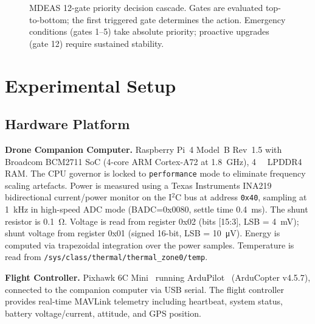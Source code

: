 \documentclass[conference]{IEEEtran}
\begin{document}
\begin{figure}[!b]
    \caption{MDEAS 12-gate priority decision cascade. Gates are evaluated top-to-bottom; the first triggered gate determines the action. Emergency conditions (gates 1--5) take absolute priority; proactive upgrades (gate 12) require sustained stability.}
    \label{fig:mdeas-cascade}
\end{figure}

\FloatBarrier
\section{Experimental Setup}
\label{sec:setup}

\subsection{Hardware Platform}

\textbf{Drone Companion Computer.}
Raspberry Pi~4 Model~B Rev~1.5 with Broadcom BCM2711 SoC (4-core ARM Cortex-A72 at \SI{1.8}{\giga\hertz}), \SI{4}{\giga\byte} LPDDR4 RAM.
The CPU governor is locked to \texttt{performance} mode to eliminate frequency scaling artefacts.
Power is measured using a Texas Instruments INA219~\cite{ina219} bidirectional current/power monitor on the I$^2$C bus at address \texttt{0x40}, sampling at \SI{1}{\kilo\hertz} in high-speed ADC mode (BADC=0x0080, settle time \SI{0.4}{\milli\second}).
The shunt resistor is \SI{0.1}{\ohm}.
Voltage is read from register 0x02 (bits [15:3], LSB = \SI{4}{\milli\volt}); shunt voltage from register 0x01 (signed 16-bit, LSB = \SI{10}{\micro\volt}).
Energy is computed via trapezoidal integration over the power samples.
Temperature is read from \texttt{/sys/class/thermal/thermal\_zone0/temp}.

\textbf{Flight Controller.}
Pixhawk 6C Mini~\cite{pixhawk} running ArduPilot~\cite{ardupilot} (ArduCopter v4.5.7), connected to the companion computer via USB serial.
The flight controller provides real-time MAVLink telemetry including heartbeat, system status, battery voltage/current, attitude, and GPS position.
\end{document}
